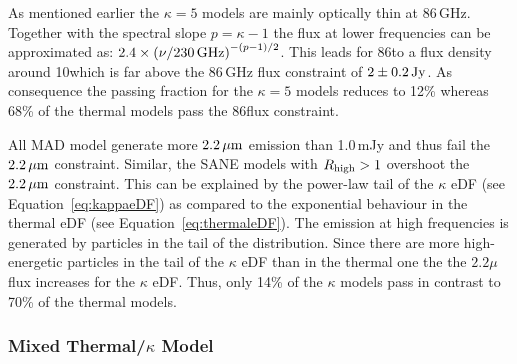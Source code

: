 As mentioned earlier the $\kappa=5$ models are mainly optically thin at 86\,GHz.
Together with the spectral slope $p=\kappa-1$ the flux at lower frequencies can be approximated as: $2.4\times \left(\nu/230\,\mathrm{GHz}\right)^{-(p-1)/2}$.
This leads for 86\GHz to a flux density around 10\Jy which is far above the 86\,GHz flux constraint of $2\pm0.2\,\mathrm{Jy}$.
As consequence the passing fraction for the $\kappa=5$ models reduces to 12\% whereas 68\% of the thermal models pass the 86\GHz flux constraint.


All MAD model generate more $2.2\,\mu\mathrm{m}$ emission than 1.0\,mJy and thus fail the $2.2\,\mu\mathrm{m}$ constraint.
Similar, the SANE models with $R_\mathrm{high}>1$ overshoot the $2.2\,\mu\mathrm{m}$ constraint.
This can be explained by the power-law tail of the $\kappa$ eDF (see Equation~\ref{eq:kappaeDF}) as compared to the exponential behaviour in the thermal eDF (see Equation~\ref{eq:thermaleDF}).
The emission at high frequencies is generated by particles in the tail of the distribution.
Since there are more high-energetic particles in the tail of the $\kappa$ eDF than in the thermal one the the $2.2\mu$ flux increases for the $\kappa$ eDF.
Thus, only 14\% of the $\kappa$ models pass in contrast to 70\% of the thermal models.

\subsubsection{Mixed Thermal/\texorpdfstring{$\kappa$}{kappa} Model}

